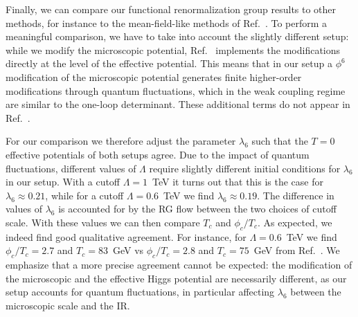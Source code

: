 \documentclass[aps,prd,11pt,tightenlines,superscriptaddress,nofootinbib,preprintnumbers,notitlepage]{revtex4-1}
\begin{document}
Finally, we can compare our functional renormalization group results
to other methods, for instance to the mean-field-like methods of
Ref.~\cite{christophe_geraldine}.  To perform a meaningful comparison,
we have to take into account the slightly different setup: while we
modify the microscopic potential, Ref.~\cite{christophe_geraldine}
implements the modifications directly at the level of the effective
potential. This means that in our setup a $\phi^6$ modification of the
microscopic potential generates finite higher-order modifications
through quantum fluctuations, which in the weak coupling regime are
similar to the one-loop determinant. These additional terms do not
appear in Ref.~\cite{christophe_geraldine}.

For our comparison we therefore adjust the parameter $\lambda_6$ such
that the $T=0$ effective potentials of both setups agree. Due to the
impact of quantum fluctuations, different values of $\Lambda$ require
slightly different initial conditions for $\lambda_6$ in our setup.
With a cutoff $\Lambda=1$~TeV it turns out that this is the case for
$\lambda_6\approx 0.21$, while for a cutoff $\Lambda=0.6$~TeV we find
$\lambda_6\approx 0.19$. The difference in values of $\lambda_6$ is
accounted for by the RG flow between the two choices of cutoff scale.
With these values we can then compare $T_c$ and $\phi_c/T_c$.  As
expected, we indeed find good qualitative agreement.  For instance,
for $\Lambda=0.6$~TeV we find $\phi_c/T_c=2.7$ and $T_c=83$~GeV vs
$\phi_c/T_c=2.8$ and $T_c=75$~GeV from
Ref.~\cite{christophe_geraldine}.  We emphasize that a more precise
agreement cannot be expected: the modification of the microscopic and
the effective Higgs potential are necessarily different, as our setup
accounts for quantum fluctuations, in particular affecting
$\lambda_6$ between the microscopic scale and the IR.
\end{document}
